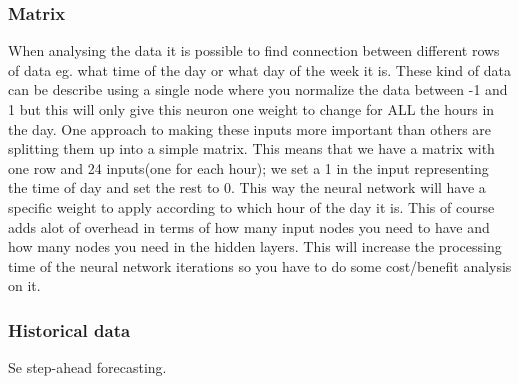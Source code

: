 \subsubsection{Matrix}
When analysing the data it is possible to find connection between different rows of data eg. what time of the day or what day of the week it is. These kind of data can be describe using a single node where you normalize the data between -1 and 1 but this will only give this neuron one weight to change for ALL the hours in the day. One approach to making these inputs more important than others are splitting them up into a simple matrix. This means that we have a matrix with one row and 24 inputs(one for each hour); we set a 1 in the input representing the time of day and set the rest to 0. This way the neural network will have a specific weight to apply according to which hour of the day it is. This of course adds alot of overhead in terms of how many input nodes you need to have and how many nodes you need in the hidden layers. This will increase the processing time of the neural network iterations so you have to do some cost/benefit analysis on it. 

\subsubsection{Historical data}
Se step-ahead forecasting.